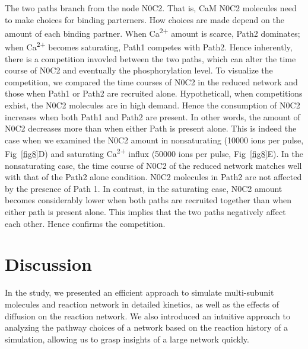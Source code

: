 \documentclass[10pt,letterpaper]{article}
\begin{document}
The two paths branch from the node N0C2. That is, CaM N0C2 molecules need to make choices for binding parterners. How choices are made depend on the amount of each binding partner. When Ca\textsuperscript{2+} amount is scarce, Path2 dominates; when Ca\textsuperscript{2+} becomes saturating, Path1 competes with Path2. Hence inherently, there is a competition invovled between the two paths, which can alter the time course of N0C2 and eventually the phosphorylation level. To visualize the competition, we compared the time courses of N0C2 in the reduced network and those when Path1 or Path2 are recruited alone. Hypotheticall, when competitions exhist, the N0C2 molecules are in high demand. Hence the consumption of N0C2 increases when both Path1 and Path2 are present. In other words, the amount of N0C2 decreases more than when either Path is present alone. This is indeed the case when we examined the N0C2 amount in nonsaturating (10000 ions per pulse, Fig~\ref{fig8}D) and saturating Ca\textsuperscript{2+} influx (50000 ions per pulse, Fig~\ref{fig8}E). In the nonsaturating case, the time course of N0C2 of the reduced network matches well with that of the Path2 alone condition. N0C2 molecules in Path2 are not affected by the presence of Path 1. In contrast, in the saturating case, N0C2 amount becomes considerably lower when both paths are recruited together than when either path is present alone. This implies that the two paths negatively affect each other. Hence confirms the competition.

\section*{Discussion}
In the study, we presented an efficient approach to simulate multi-subunit molecules and reaction network in detailed kinetics, as well as the effects of diffusion on the reaction network. We also introduced an intuitive approach to analyzing the pathway choices of a network based on the reaction history of a simulation, allowing us to grasp insights of a large network quickly.
\end{document}
